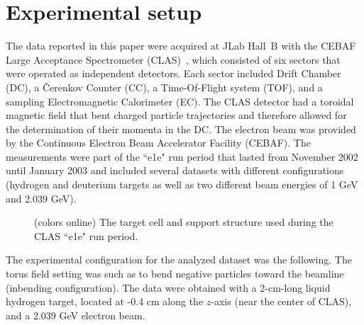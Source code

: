 \documentclass[prc,twocolumn,superscriptaddress,showpacs,amssymb,amsmath,amsfonts,aps,nofootinbib]{revtex4-1}
\begin{document}
\section{Experimental setup}


The data reported in this paper were acquired at JLab Hall~B  with the CEBAF Large Acceptance Spectrometer (CLAS)~\cite{Me03}, which consisted of six sectors that were operated as independent detectors. Each sector included Drift Chamber (DC), a \v Cerenkov Counter (CC), a Time-Of-Flight system (TOF), and a sampling Electromagnetic Calorimeter (EC). The CLAS detector had a toroidal magnetic field that bent charged particle trajectories and therefore allowed for the determination of their momenta in the DC.
The electron beam was provided by the Continuous Electron Beam Accelerator Facility (CEBAF).
The measurements were part of the  ``e1e" run period that lasted from November 2002 until January 2003 and included several datasets with different configurations (hydrogen and deuterium targets as well as two different beam energies of 1 GeV and 2.039 GeV). 
 


\begin{figure}[htp]
\begin{center}
\vspace{-0.1cm}
\caption{(colors online) The target cell and support structure used during the CLAS ``e1e" run period.}
\label{fig:e1e_target}
\end{center}
\end{figure} 

The experimental configuration for the analyzed dataset was the following. The torus field setting was such as to bend negative particles toward the beamline (inbending configuration).
The data  were obtained with a 2-cm-long liquid hydrogen target, located at -0.4 cm along the $z$-axis (near the center of CLAS), and a 2.039 GeV electron beam.
\end{document}
